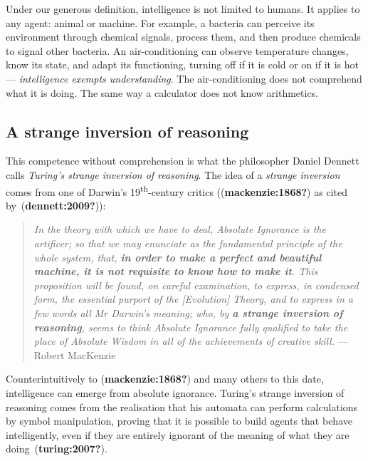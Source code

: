 \documentclass[
  letterpaper,
  DIV=11,
  numbers=noendperiod,
  oneside]{scrreprt}
\begin{document}
Under our generous definition, intelligence is not limited to humans. It
applies to any agent: animal or machine. For example, a
bacteria can perceive its environment through chemical signals, process
them, and then produce chemicals to signal other bacteria. An
air-conditioning can observe temperature changes, know its state, and
adapt its functioning, turning off if it is cold or on if it is hot ---
\emph{intelligence exempts understanding}. The air-conditioning does not
comprehend what it is doing. The same way a calculator does not know
arithmetics.

\hypertarget{a-strange-inversion-of-reasoning}{%
\subsection{A strange inversion of
reasoning}\label{a-strange-inversion-of-reasoning}}

This competence without comprehension is what the philosopher Daniel
Dennett calls \emph{Turing's strange inversion of
reasoning}\protect\hypertarget{turing_strange_inversion}{}{}.
The idea of a \emph{strange inversion} comes from one of Darwin's
19\textsuperscript{th}-century critics ((\textbf{mackenzie:1868?}) as
cited by~(\textbf{dennett:2009?})):

\begin{quote}
\emph{In the theory with which we have to deal, Absolute Ignorance is
the artificer; so that we may enunciate as the fundamental principle of
the whole system, that, \textbf{in order to make a perfect and beautiful
machine, it is not requisite to know how to make it}. This proposition
will be found, on careful examination, to express, in condensed form,
the essential purport of the {[}Evolution{]} Theory, and to express in a
few words all Mr Darwin's meaning; who, by \textbf{a strange inversion
of reasoning}, seems to think Absolute Ignorance fully qualified to take
the place of Absolute Wisdom in all of the achievements of creative
skill.} --- Robert MacKenzie\\
\end{quote}

Counterintuitively to (\textbf{mackenzie:1868?}) and many others to this
date, intelligence can emerge from absolute ignorance. Turing's strange
inversion of reasoning comes from the realisation that his automata can
perform calculations by symbol manipulation, proving that it is possible
to build agents that behave intelligently, even if they are entirely
ignorant of the meaning of what they are doing~(\textbf{turing:2007?}).
\end{document}
